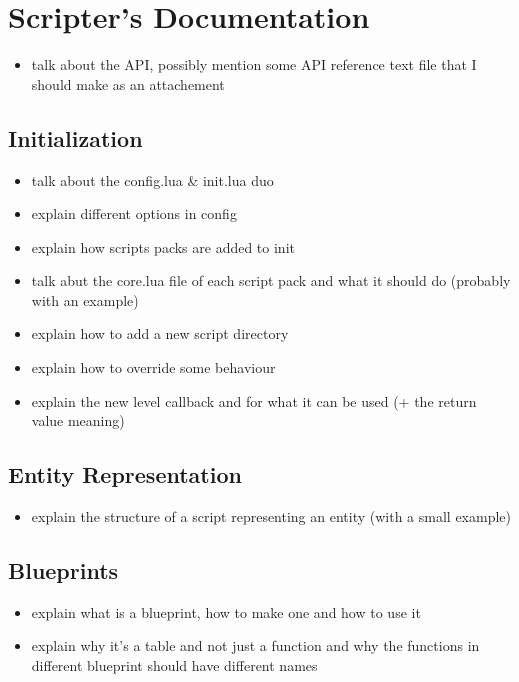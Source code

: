 \chapter{Scripter's Documentation}

\begin{itemize}
    \item talk about the API, possibly mention some API reference text file
        that I should make as an attachement
\end{itemize}

\section{Initialization}

\begin{itemize}
    \item talk about the config.lua \& init.lua duo
    \item explain different options in config
    \item explain how scripts packs are added to init
    \item talk abut the core.lua file of each script pack
        and what it should do (probably with an example)
    \item explain how to add a new script directory
    \item explain how to override some behaviour
    \item explain the new level callback and for what it can be used
        (+ the return value meaning)
\end{itemize}

\section{Entity Representation}

\begin{itemize}
    \item explain the structure of a script representing
        an entity (with a small example)
\end{itemize}

\section{Blueprints}

\begin{itemize}
    \item explain what is a blueprint, how to make one and
        how to use it
    \item explain why it's a table and not just a function
        and why the functions in different blueprint should
        have different names
\end{itemize}

